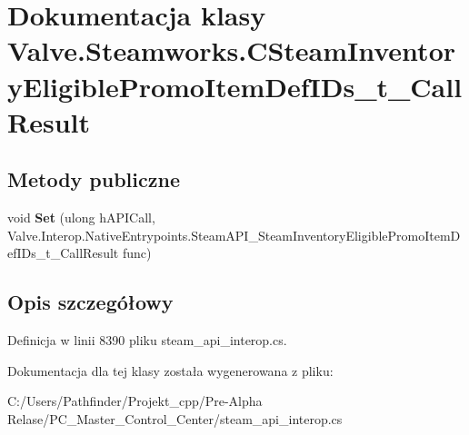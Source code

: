 \hypertarget{class_valve_1_1_steamworks_1_1_c_steam_inventory_eligible_promo_item_def_i_ds__t___call_result}{}\section{Dokumentacja klasy Valve.\+Steamworks.\+C\+Steam\+Inventory\+Eligible\+Promo\+Item\+Def\+I\+Ds\+\_\+t\+\_\+\+Call\+Result}
\label{class_valve_1_1_steamworks_1_1_c_steam_inventory_eligible_promo_item_def_i_ds__t___call_result}
\subsection*{Metody publiczne}
\begin{DoxyCompactItemize}
\item 
\mbox{\label{class_valve_1_1_steamworks_1_1_c_steam_inventory_eligible_promo_item_def_i_ds__t___call_result_a0ac88c426e6c0674784f4d0c7005b332}} 
void {\bfseries Set} (ulong h\+A\+P\+I\+Call, Valve.\+Interop.\+Native\+Entrypoints.\+Steam\+A\+P\+I\+\_\+\+Steam\+Inventory\+Eligible\+Promo\+Item\+Def\+I\+Ds\+\_\+t\+\_\+\+Call\+Result func)
\end{DoxyCompactItemize}


\subsection{Opis szczegółowy}


Definicja w linii 8390 pliku steam\+\_\+api\+\_\+interop.\+cs.



Dokumentacja dla tej klasy została wygenerowana z pliku\+:\begin{DoxyCompactItemize}
\item 
C\+:/\+Users/\+Pathfinder/\+Projekt\+\_\+cpp/\+Pre-\/\+Alpha Relase/\+P\+C\+\_\+\+Master\+\_\+\+Control\+\_\+\+Center/steam\+\_\+api\+\_\+interop.\+cs\end{DoxyCompactItemize}
